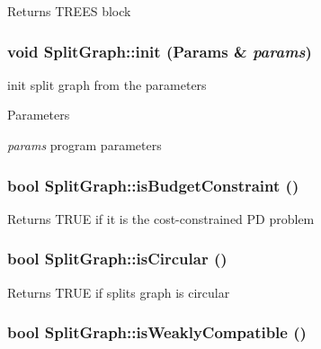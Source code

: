 \label{classSplitGraph_ad10d2632515ccf7b795cb9ace660e050}
\begin{DoxyReturn}{Returns}
TREES block 
\end{DoxyReturn}
\hypertarget{classSplitGraph_a0111a637ecb711d90f2f15ce734a96c8}{
\subsubsection[{init}]{\setlength{\rightskip}{0pt plus 5cm}void SplitGraph::init ({\bf Params} \& {\em params})}}
\label{classSplitGraph_a0111a637ecb711d90f2f15ce734a96c8}
init split graph from the parameters 
\begin{DoxyParams}{Parameters}
\item[{\em params}]program parameters \end{DoxyParams}
\hypertarget{classSplitGraph_a93a2b7ec12a3f75f143a2dfada8d7a02}{
\subsubsection[{isBudgetConstraint}]{\setlength{\rightskip}{0pt plus 5cm}bool SplitGraph::isBudgetConstraint ()}}
\label{classSplitGraph_a93a2b7ec12a3f75f143a2dfada8d7a02}
\begin{DoxyReturn}{Returns}
TRUE if it is the cost-\/constrained PD problem 
\end{DoxyReturn}
\hypertarget{classSplitGraph_ae7b98f722c61033d05cee4b1e2c68e54}{
\subsubsection[{isCircular}]{\setlength{\rightskip}{0pt plus 5cm}bool SplitGraph::isCircular ()}}
\label{classSplitGraph_ae7b98f722c61033d05cee4b1e2c68e54}
\begin{DoxyReturn}{Returns}
TRUE if splits graph is circular 
\end{DoxyReturn}
\hypertarget{classSplitGraph_a05cfb8141526a6cbc5905eb74dccc0fa}{
\subsubsection[{isWeaklyCompatible}]{\setlength{\rightskip}{0pt plus 5cm}bool SplitGraph::isWeaklyCompatible ()}}
